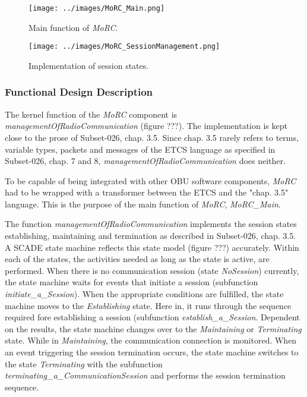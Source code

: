 \begin{figure}
\centering
\texttt{[image: ../images/MoRC\_Main.png]}
\caption{Main function of \textit{MoRC}.}
\end{figure}

\begin{figure}
\centering
\texttt{[image: ../images/MoRC\_SessionManagement.png]}
\caption{Implementation of session states.}
\end{figure}


\subsubsection{Functional Design Description}

The kernel function of the \textit{MoRC} component is \emph{managementOfRadioCommunication} (figure ???). The implementation is kept close to the prose of Subset-026, chap. 3.5. Since chap. 3.5 rarely refers to terms, variable types, packets and messages of the ETCS language as specified in Subset-026, chap. 7 and 8, \emph{managementOfRadioCommunication} does neither. 

To be capable of being integrated with other OBU software components, \emph{MoRC} had to be wrapped with a transformer between the ETCS and the "chap. 3.5" language. This is the purpose of the main function of \emph{MoRC}, \emph{MoRC\_Main}. 



The function \emph{managementOfRadioCommunication} implements the session states establishing, maintaining and termination as described in Subset-026, chap. 3.5. A SCADE state machine reflects this state model (figure ???) accurately. Within each of the states, the activities needed as long as the state is active, are performed. When there is no communication session (state \emph{NoSession}) currently, the state machine waits for events that initiate a session (subfunction \emph{initiate\_a\_Session}). When the appropriate conditions are fulfilled, the state machine moves to the \textit{Establishing} state. Here in, it runs through the sequence required fore establishing a session (subfunction \emph{establish\_a\_Session}. Dependent on the results, the state machine changes over to the \emph{Maintaining} or \emph{Terminating} state. While in \emph{Maintaining}, the communication connection is monitored. When an event triggering the session termination occurs, the state machine switches to the state \emph{Terminating} with the subfunction \emph{terminating\_a\_CommunicationSession} and performs the session termination sequence. 


